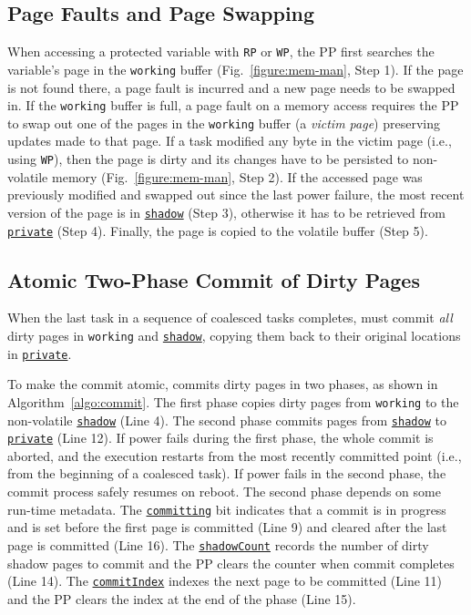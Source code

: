 \subsection{Page Faults and Page Swapping}

When accessing a protected variable with \texttt{RP} or \texttt{WP}, the PP first searches the variable's page in the \texttt{working} buffer (Fig.~\ref{figure:mem-man}, Step 1).
If the page is not found there, a page fault is incurred and a new page needs to be swapped in.
If the \texttt{working} buffer is full, a page fault on a memory access requires the PP to swap out one of the pages in the \texttt{working} buffer (a \emph{victim page}) preserving updates made to that page.
If a task modified any byte in the victim page (i.e., using \texttt{WP}), then the page is dirty and its changes have to be persisted to non-volatile memory (Fig.~\ref{figure:mem-man}, Step 2). If the accessed page was previously modified and swapped out since the last power failure, the most recent version of the page is in {\tt \underline{shadow}} (Step 3), otherwise it has to be retrieved from {\tt \underline{private}} (Step 4). Finally, the page is copied to the volatile buffer (Step 5).

\subsection{Atomic Two-Phase Commit of Dirty Pages}

When the last task in a sequence of coalesced tasks completes, \sys must commit \emph{all} dirty pages in \texttt{working} and \texttt{\underline{shadow}}, copying them back to their original locations in \texttt{\underline{private}}. 

To make the commit atomic, \sys commits dirty pages in two phases, as shown in Algorithm~\ref{algo:commit}. The first phase copies dirty pages from \texttt{working} to the non-volatile \texttt{\underline{shadow}} (Line 4). The second phase commits pages from \texttt{\underline{shadow}} to \texttt{\underline{private}} (Line 12).  If power fails during the first phase, the whole commit is aborted, and the execution restarts from the most recently committed point (i.e., from the beginning of a coalesced task). If power fails in the second
phase, the commit process safely resumes on reboot.  The second phase depends on some run-time metadata. The \texttt{\underline{committing}} bit indicates that a commit is in progress and is set before the first page is committed (Line 9) and cleared after the last page is committed (Line 16).  The \texttt{\underline{shadowCount}} records the number of dirty shadow pages to commit and the PP clears the counter when commit completes (Line 14). The \texttt{\underline{commitIndex}} indexes the next page to be committed (Line 11) and the PP clears the index at the end of the phase (Line 15).

